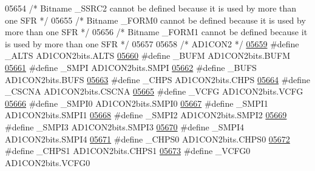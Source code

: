 \begin{DoxyCode}
05654 \textcolor{comment}{/* Bitname \_SSRC2 cannot be defined because it is used by more than one SFR */}
05655 \textcolor{comment}{/* Bitname \_FORM0 cannot be defined because it is used by more than one SFR */}
05656 \textcolor{comment}{/* Bitname \_FORM1 cannot be defined because it is used by more than one SFR */}
05657 
05658 \textcolor{comment}{/* AD1CON2 */}
\hypertarget{a00015_source_l05659}{}\hyperlink{a00015_ac12b887f90e13ade5e23e7708f4c8485}{05659} \textcolor{preprocessor}{#define \_ALTS AD1CON2bits.ALTS}
\hypertarget{a00015_source_l05660}{}\hyperlink{a00015_a16f24daad17547b055a217ecd935d85e}{05660} \textcolor{preprocessor}{#define \_BUFM AD1CON2bits.BUFM}
\hypertarget{a00015_source_l05661}{}\hyperlink{a00015_a3c1fe973f4a5f8b3c0f8903f445cbcaf}{05661} \textcolor{preprocessor}{#define \_SMPI AD1CON2bits.SMPI}
\hypertarget{a00015_source_l05662}{}\hyperlink{a00015_adcc85cb11c412a2d2a4f84a1f39a4b65}{05662} \textcolor{preprocessor}{#define \_BUFS AD1CON2bits.BUFS}
\hypertarget{a00015_source_l05663}{}\hyperlink{a00015_a8ca5a880c36e995e697bbb4a69e022b1}{05663} \textcolor{preprocessor}{#define \_CHPS AD1CON2bits.CHPS}
\hypertarget{a00015_source_l05664}{}\hyperlink{a00015_aeb2ce140daf83f21d4d65065dd66111e}{05664} \textcolor{preprocessor}{#define \_CSCNA AD1CON2bits.CSCNA}
\hypertarget{a00015_source_l05665}{}\hyperlink{a00015_aa87d90c6eacb675e3177e12b6cc3426e}{05665} \textcolor{preprocessor}{#define \_VCFG AD1CON2bits.VCFG}
\hypertarget{a00015_source_l05666}{}\hyperlink{a00015_a95ddfd96f670f1c5127663bf849758be}{05666} \textcolor{preprocessor}{#define \_SMPI0 AD1CON2bits.SMPI0}
\hypertarget{a00015_source_l05667}{}\hyperlink{a00015_aa82841bc4442cbb573d687e14e709643}{05667} \textcolor{preprocessor}{#define \_SMPI1 AD1CON2bits.SMPI1}
\hypertarget{a00015_source_l05668}{}\hyperlink{a00015_aa06074aa70b83f417946c89ec227ead6}{05668} \textcolor{preprocessor}{#define \_SMPI2 AD1CON2bits.SMPI2}
\hypertarget{a00015_source_l05669}{}\hyperlink{a00015_adad7552eec3f268609297e5c0f24054e}{05669} \textcolor{preprocessor}{#define \_SMPI3 AD1CON2bits.SMPI3}
\hypertarget{a00015_source_l05670}{}\hyperlink{a00015_a68b7a030bfd08ac6d8a140c95909b628}{05670} \textcolor{preprocessor}{#define \_SMPI4 AD1CON2bits.SMPI4}
\hypertarget{a00015_source_l05671}{}\hyperlink{a00015_a296025f936afedac26a69ae7cf61857c}{05671} \textcolor{preprocessor}{#define \_CHPS0 AD1CON2bits.CHPS0}
\hypertarget{a00015_source_l05672}{}\hyperlink{a00015_ad4d1ccbe8c057a37a319f2d8dec6268c}{05672} \textcolor{preprocessor}{#define \_CHPS1 AD1CON2bits.CHPS1}
\hypertarget{a00015_source_l05673}{}\hyperlink{a00015_a8ff5759693655f86db18d63ed05a821a}{05673} \textcolor{preprocessor}{#define \_VCFG0 AD1CON2bits.VCFG0}

\end{DoxyCode}
